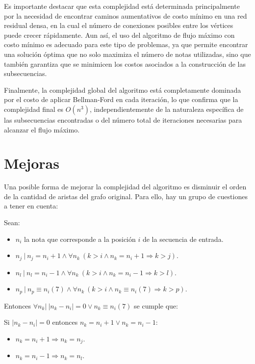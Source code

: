 \documentclass{article}
\begin{document}
Es importante destacar que esta complejidad está determinada principalmente por la necesidad de encontrar caminos aumentativos de costo mínimo en una red residual densa, en la cual el número de conexiones posibles entre los vértices puede crecer rápidamente. Aun así, el uso del algoritmo de flujo máximo con costo mínimo es adecuado para este tipo de problemas, ya que permite encontrar una solución óptima que no solo maximiza el número de notas utilizadas, sino que también garantiza que se minimicen los costos asociados a la construcción de las subsecuencias.

Finalmente, la complejidad global del algoritmo está completamente dominada por el costo de aplicar Bellman-Ford en cada iteración, lo que confirma que la complejidad final es $O(n^3)$, independientemente de la naturaleza específica de las subsecuencias encontradas o del número total de iteraciones necesarias para alcanzar el flujo máximo.


\section{Mejoras}
Una posible forma de mejorar la complejidad del algoritmo es disminuir el orden de la cantidad de aristas del grafo original. Para ello, hay un grupo de cuestiones a tener en cuenta:

Sean:
\begin{itemize}
    \item $n_{i}$ la nota que corresponde a la posición $i$ de la secuencia de entrada.
    \item $n_{j}~|~ n_{j}=n_{i}+1 \wedge \forall n_{k}~ (k>i \wedge n_{k}=n_{i}+1 \Rightarrow k>j)$.
    \item $n_{l}~|~ n_{l}=n_{i}-1 \wedge \forall n_{k}~ (k>i \wedge n_{k}=n_{i}-1 \Rightarrow k>l)$.
    \item $n_{p}~|~ n_{p}\equiv n_{i}(7) \wedge \forall n_{k}~ (k>i \wedge n_{k}\equiv n_{i}(7) \Rightarrow k>p)$.
\end{itemize}

Entonces $\forall n_{k}|~ |n_{k}-n_{i}|=0  \vee n_{k}\equiv n_{i}(7)$ se cumple que:

Si $|n_{k}-n_{i}|=0$ entonces $n_{k}=n_{i}+1 \vee n_{k}=n_{i}-1$:

\begin{itemize}
    \item $n_{k}=n_{i}+1 \Rightarrow n_{k}=n_{j}$.
    \item $n_{k}=n_{i}-1 \Rightarrow n_{k}=n_{l}$.
\end{itemize}
\end{document}
